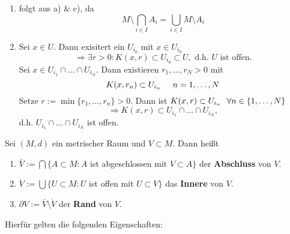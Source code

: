 \begin{prop}
\begin{beweis}
\begin{enumerate}[label=\alph*\upshape)]
			\item folgt aus a) \& c), da
				\[ M \setminus \bigcap_{i \in I} A_{i} = \bigcup_{i \in I} M \setminus A_{i} \]
			\item Sei $x \in U$. Dann exisitert ein $U_{i_{0}}$ mit $x \in U_{i_{0}}$
			\[ \Rightarrow \exists r > 0: K(x, r) \subset U_{i_{0}} \subset U, \text{ d.h. } U \text{ ist offen.}  \]
			Sei $x \in U_{i_{1}} \cap \dotsc \cap U_{i_{N}}.$ Dann existieren $r_{1}, \dotsc, r_{N} > 0$ mit
			\[ K(x, r_{n}) \subset U_{i_{n}} \hspace{0.5cm} n = 1, \dotsc, N \]
			Setze $r := \min \{ r_{1}, \dotsc, r_{n} \} > 0$. Dann ist $K(x, r) \subset U_{i_{n}} \hspace{0.25cm} \forall n \in \{ 1, \dotsc, N \}$
			\[ \Rightarrow K(x, r) \subset U_{i_{1}} \cap \dotsc \cap U_{i_{N}}, \]
			d.h. $U_{i_{1}} \cap \dotsc \cap U_{i_{N}}$ ist offen.
		\end{enumerate}	
	\end{beweis}
\end{prop}

\begin{definition} \label{def:1-4.7-abschinnrand}
	Sei $(M, d)$ ein metrischer Raum und $V \subset M$. Dann hei{\ss}t 
	\begin{enumerate}[label=\alph*\upshape)]   
		\item $\bar V := \bigcap \{ A \subset M: A$ ist abgeschlossen mit $V \subset A \} $ der \textbf{Abschluss} von $V$.
		\item $\mathring V := \bigcup \{ U \subset M: U$ ist offen mit $U \subset V \}$ das \textbf{Innere} von $V$. 
		\item $ \partial V := \bar V \setminus \mathring V$ der \textbf{Rand} von $V$.
	\end{enumerate}
\end{definition}

Hierfür gelten die folgenden Eigenschaften:

